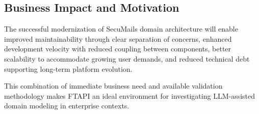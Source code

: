 \subsection{Business Impact and Motivation}
The successful modernization of SecuMails domain architecture will enable improved maintainability through clear separation of concerns, enhanced development velocity with reduced coupling between components, better scalability to accommodate growing user demands, and reduced technical debt supporting long-term platform evolution.

This combination of immediate business need and available validation methodology makes FTAPI an ideal environment for investigating LLM-assisted domain modeling in enterprise contexts.